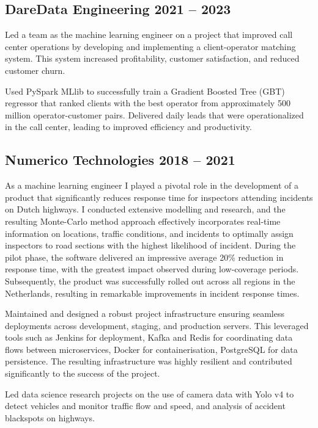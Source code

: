 \subsection{DareData Engineering \hfill 2021 -- 2023}
    \begin{list2}
        \item Led a team as the machine learning engineer on a project that improved call center operations by developing and implementing a client-operator matching system. This system increased profitability, customer satisfaction, and reduced customer churn.
        \item Used PySpark MLlib to successfully train a Gradient Boosted Tree (GBT) regressor that ranked clients with the best operator from approximately 500 million operator-customer pairs. Delivered daily leads that were operationalized in the call center, leading to improved efficiency and productivity.
    \end{list2}

\subsection{Numerico Technologies \hfill 2018 -- 2021}
    \begin{list2}
         \item As a machine learning engineer I played a pivotal role in the development of a product that significantly reduces response time for inspectors attending incidents on Dutch highways. I conducted extensive modelling and research, and the resulting Monte-Carlo method approach effectively incorporates real-time information on locations, traffic conditions, and incidents to optimally assign inspectors to road sections with the highest likelihood of incident. During the pilot phase, the software delivered an impressive average 20\% reduction in response time, with the greatest impact observed during low-coverage periods. Subsequently, the product was successfully rolled out across all regions in the Netherlands, resulting in remarkable improvements in incident response times.
         \item Maintained and designed a robust project infrastructure ensuring seamless deployments across development, staging, and production servers. This leveraged tools such as Jenkins for deployment, Kafka and Redis for coordinating data flows between microservices, Docker for containerisation, PostgreSQL for data persistence. The resulting infrastructure was highly resilient and contributed significantly to the success of the project.
         \item Led data science research projects on the use of camera data with Yolo v4 to detect vehicles and monitor traffic flow and speed, and analysis of accident blackspots on highways.
    \end{list2}

